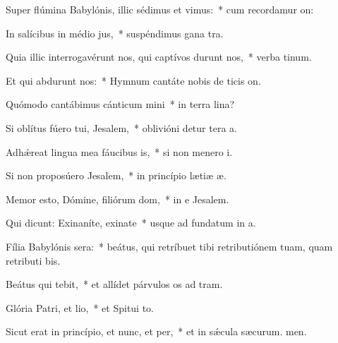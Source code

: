 \item Super flúmina Babylónis, illic sédimus et vimus:~* cum recordamur on:
\item In salícibus in médio jus,~* suspéndimus gana tra.
\item Quia illic interrogavérunt nos, qui captívos durunt nos,~* verba tinum.
\item Et qui abdurunt nos:~* Hymnum cantáte nobis de ticis on.
\item Quómodo cantábimus cánticum mini~* in terra lina?
\item Si oblítus fúero tui, Jesalem,~* oblivióni detur tera a.
\item Adhǽreat lingua mea fáucibus is,~* si non menero i.
\item Si non proposúero Jesalem,~* in princípio lætiæ æ.
\item Memor esto, Dómine, filiórum dom,~* in e Jesalem.
\item Qui dicunt: Exinaníte, exinate~* usque ad fundatum in a.
\item Fília Babylónis sera:~* beátus, qui retríbuet tibi retributiónem tuam, quam retributi bis.
\item Beátus qui tebit,~* et allídet párvulos os ad tram.
\item Glória Patri, et lio,~* et Spitui to.
\item Sicut erat in princípio, et nunc, et per,~* et in sǽcula sæcurum. men.
